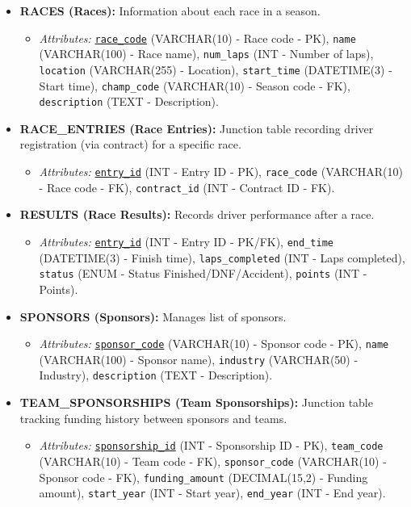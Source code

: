 \documentclass[12pt, a4paper]{report}
\begin{document}
\begin{tcolorbox}
\begin{itemize}[leftmargin=1.5cm]
    \item \textbf{RACES (Races):} Information about each race in a season.
    \begin{itemize}
        \item \textit{Attributes:} \texttt{\underline{race\_code}} (VARCHAR(10) - Race code - PK), \texttt{name} (VARCHAR(100) - Race name), \texttt{num\_laps} (INT - Number of laps), \texttt{location} (VARCHAR(255) - Location), \texttt{start\_time} (DATETIME(3) - Start time), \texttt{champ\_code} (VARCHAR(10) - Season code - FK), \texttt{description} (TEXT - Description).
    \end{itemize}

    \item \textbf{RACE\_ENTRIES (Race Entries):} Junction table recording driver registration (via contract) for a specific race.
    \begin{itemize}
        \item \textit{Attributes:} \texttt{\underline{entry\_id}} (INT - Entry ID - PK), \texttt{race\_code} (VARCHAR(10) - Race code - FK), \texttt{contract\_id} (INT - Contract ID - FK).
    \end{itemize}

    \item \textbf{RESULTS (Race Results):} Records driver performance after a race.
    \begin{itemize}
        \item \textit{Attributes:} \texttt{\underline{entry\_id}} (INT - Entry ID - PK/FK), \texttt{end\_time} (DATETIME(3) - Finish time), \texttt{laps\_completed} (INT - Laps completed), \texttt{status} (ENUM - Status Finished/DNF/Accident), \texttt{points} (INT - Points).
    \end{itemize}

    \item \textbf{SPONSORS (Sponsors):} Manages list of sponsors.
    \begin{itemize}
        \item \textit{Attributes:} \texttt{\underline{sponsor\_code}} (VARCHAR(10) - Sponsor code - PK), \texttt{name} (VARCHAR(100) - Sponsor name), \texttt{industry} (VARCHAR(50) - Industry), \texttt{description} (TEXT - Description).
    \end{itemize}

    \item \textbf{TEAM\_SPONSORSHIPS (Team Sponsorships):} Junction table tracking funding history between sponsors and teams.
    \begin{itemize}
        \item \textit{Attributes:} \texttt{\underline{sponsorship\_id}} (INT - Sponsorship ID - PK), \texttt{team\_code} (VARCHAR(10) - Team code - FK), \texttt{sponsor\_code} (VARCHAR(10) - Sponsor code - FK), \texttt{funding\_amount} (DECIMAL(15,2) - Funding amount), \texttt{start\_year} (INT - Start year), \texttt{end\_year} (INT - End year).
    \end{itemize}


\end{itemize}
\end{tcolorbox}
\end{document}
